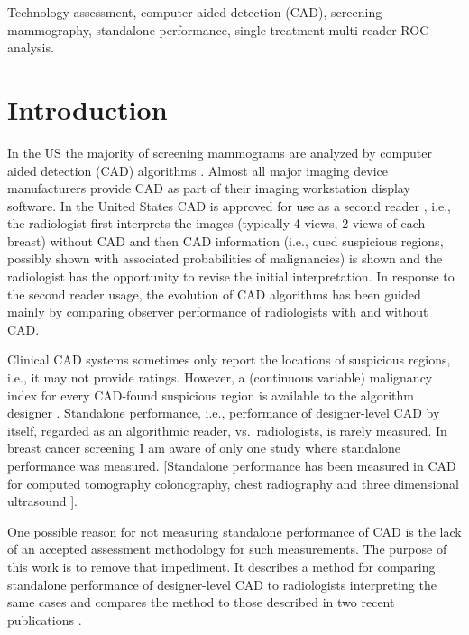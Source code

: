 \documentclass[
]{book}
\begin{document}
Technology assessment, computer-aided detection (CAD), screening mammography, standalone performance, single-treatment multi-reader ROC analysis.

\hypertarget{standalone-cad-radiologists-introduction}{%
\section{Introduction}\label{standalone-cad-radiologists-introduction}}

In the US the majority of screening mammograms are analyzed by computer aided detection (CAD) algorithms \citep{rao2010widely}. Almost all major imaging device manufacturers provide CAD as part of their imaging workstation display software. In the United States CAD is approved for use as a second reader \citep{fda2018guidance}, i.e., the radiologist first interprets the images (typically 4 views, 2 views of each breast) without CAD and then CAD information (i.e., cued suspicious regions, possibly shown with associated probabilities of malignancies) is shown and the radiologist has the opportunity to revise the initial interpretation. In response to the second reader usage, the evolution of CAD algorithms has been guided mainly by comparing observer performance of radiologists with and without CAD.

Clinical CAD systems sometimes only report the locations of suspicious regions, i.e., it may not provide ratings. However, a (continuous variable) malignancy index for every CAD-found suspicious region is available to the algorithm designer \citep{edwards2002maximum}. Standalone performance, i.e., performance of designer-level CAD by itself, regarded as an algorithmic reader, vs.~radiologists, is rarely measured. In breast cancer screening I am aware of only one study \citep{hupse2013standalone} where standalone performance was measured. {[}Standalone performance has been measured in CAD for computed tomography colonography, chest radiography and three dimensional ultrasound \citep{hein2010computeraided, summers2008performance, taylor2006computerassisted, deBoo2011computeraided, tan2012computeraided}{]}.

One possible reason for not measuring standalone performance of CAD is the lack of an accepted assessment methodology for such measurements. The purpose of this work is to remove that impediment.
It describes a method for comparing standalone performance of designer-level CAD to radiologists interpreting the same cases and compares the method to those described in two recent publications \citep{hupse2013standalone, kooi2016comparison}.
\end{document}
